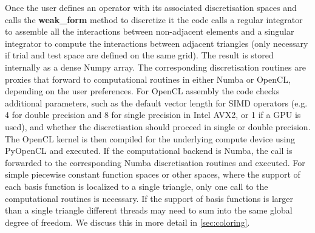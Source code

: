 Once the user defines an operator with its associated discretisation spaces and calls the \textbf{weak\_form} method to discretize it the code calls a regular integrator to assemble all the interactions between non-adjacent elements and a singular integrator to compute the interactions between adjacent triangles (only necessary if trial and test space are defined on the same grid). The result is stored internally as a dense Numpy array. The corresponding discretisation routines are proxies that forward to computational routines in either Numba or OpenCL, depending on the user preferences. For OpenCL assembly the code checks additional parameters, such as the default vector length for SIMD operators (e.g. 4 for double precision and 8 for single precision in Intel AVX2, or 1 if a GPU is used), and whether the discretisation should proceed in single or double precision. The OpenCL kernel is then compiled for the underlying compute device using PyOpenCL and executed. If the computational backend is Numba, the call is forwarded to the corresponding Numba discretisation routines and executed. For simple piecewise constant function spaces or other spaces, where the support of each basis function is localized to a single triangle, only one call to the computational routines is necessary. If the support of basis functions is larger than a single triangle different threads may need to sum into the same global degree of freedom. We discuss this in more detail in \cref{sec:coloring}.
